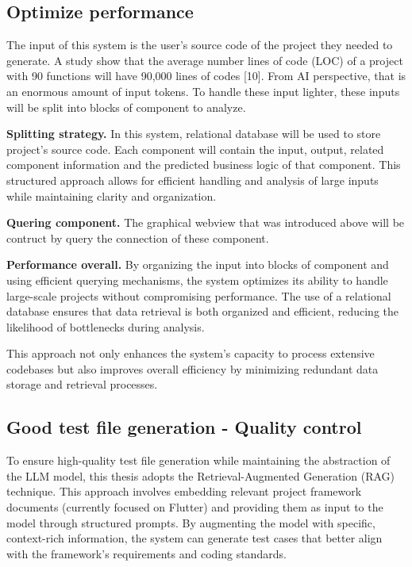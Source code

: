 \subsection{Optimize performance}

\hspace{0.5cm}The input of this system is the user’s source code of the project they needed to generate. A study show that the average number lines of code (LOC) of a project with 90 functions will have 90,000 lines of codes [10]. From AI perspective, that is an enormous amount of input tokens. To handle these input lighter, these inputs will be split into blocks of component to analyze.

\hspace{0.5cm}\textbf{Splitting strategy.}		In this system, relational database will be used to store project’s source code. Each component will contain the input, output, related component information and the predicted business logic of that component. This structured approach allows for efficient handling and analysis of large inputs while maintaining clarity and organization.

\hspace{0.5cm}\textbf{Quering component.}		The graphical webview that was introduced above will be contruct by query the connection of these component. 

\hspace{0.5cm}\textbf{Performance overall.}	By organizing the input into blocks of component and using efficient querying mechanisms, the system optimizes its ability to handle large-scale projects without compromising performance. The use of a relational database ensures that data retrieval is both organized and efficient, reducing the likelihood of bottlenecks during analysis.

\hspace{0.5cm}This approach not only enhances the system's capacity to process extensive codebases but also improves overall efficiency by minimizing redundant data storage and retrieval processes.

\subsection{Good test file generation - Quality control}

\hspace{0.5cm}To ensure high-quality test file generation while maintaining the abstraction of the LLM model, this thesis adopts the Retrieval-Augmented Generation (RAG) technique. This approach involves embedding relevant project framework documents (currently focused on Flutter) and providing them as input to the model through structured prompts. By augmenting the model with specific, context-rich information, the system can generate test cases that better align with the framework’s requirements and coding standards.

